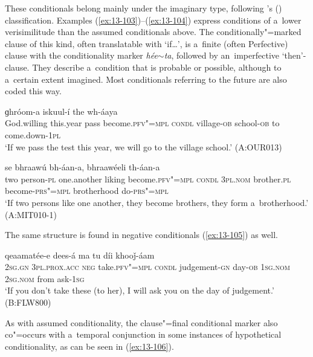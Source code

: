  These conditionals belong mainly under the imaginary type, following \citeauthor{thompsonlongacre1985}'s (\citeyear[195]{thompsonlongacre1985}) classification. Examples (\ref{ex:13-103})--(\ref{ex:13-104}) express conditions of a~lower verisimilitude than the assumed conditionals above. The conditionally"=marked clause of this kind, often translatable with `if{\ldots}', is a~finite (often Perfective) clause with the conditionality marker \textit{hée$\sim$ta}, followed by an~imperfective `then'-clause. They describe a~condition that is probable or possible, although to a~certain extent imagined. Most conditionals referring to the future are also coded this way.

\begin{exe}
\ex
\label{ex:13-103}
  ɡhróom-a iskuul-í the wh-áaya \\
 God.willing this.year  pass become.\textsc{pfv"=mpl} \textsc{condl}  village-\textsc{ob} school-\textsc{ob} to come.down-\textsc{1pl} \\
\glt `If we pass the test this year, we will go to the village school.' (A:OUR013)

\ex
\label{ex:13-104}
 se bhraawú bh-áan-a,
bhraawéeli  th-áan-a \\
two person-\textsc{pl} one.another liking become.\textsc{pfv"=mpl}  \textsc{condl } \textsc{3pl.nom} brother.\textsc{pl} become-\textsc{prs"=mpl} brotherhood do-\textsc{prs"=mpl} \\
\glt `If two persons like one another, they become brothers, they form a~brotherhood.' (A:MIT010-1) 
\end{exe}

The same structure is found in negative conditionals (\ref{ex:13-105}) as well.

\begin{exe}
\ex
\label{ex:13-105}
  qeaamatée-e dees-á ma tu díi khooǰ-áam \\
\textsc{2sg.gn} \textsc{3pl.prox.acc} \textsc{neg} take.\textsc{pfv"=mpl} \textsc{condl} judgement-\textsc{gn} day-\textsc{ob} \textsc{1sg.nom} \textsc{2sg.nom} from ask-\textsc{1sg}  \\
\glt `If you don't take these (to her), I will ask you on the day of judgement.' (B:FLW800) 
\end{exe}

As with assumed conditionality, the clause"=final conditional marker also co"=occurs with a~temporal conjunction in some instances of hypothetical conditionality, as can be seen in (\ref{ex:13-106}). 

